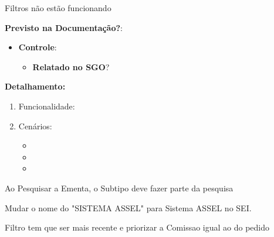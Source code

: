 \begin{falha}[1]{Filtros não estão funcionando}
	
	
	\textbf{Previsto na Documentação?}: \mschecksim
	\begin{itemize}
		
		\item \textbf{Controle}:
		\begin{itemize}
			\item \textbf{Relatado no SGO}? \mschecksim 
		\end{itemize}
	\end{itemize}
	
	\tcblower
	
	\textbf{Detalhamento:}
	\begin{enumerate}
		
		\item Funcionalidade: \sosFu
		\item Cenários:
		\begin{itemize}
			\item \sosFuCs
			\item \sosFuCe
			\item \sosFuCo
		\end{itemize}
		
	\end{enumerate}
\end{falha}






Ao Pesquisar a Ementa, o Subtipo deve fazer parte da pesquisa

Mudar o nome do "SISTEMA ASSEL" para Sistema ASSEL no SEI.


Filtro tem que ser mais recente e priorizar a Comissao igual ao do pedido





